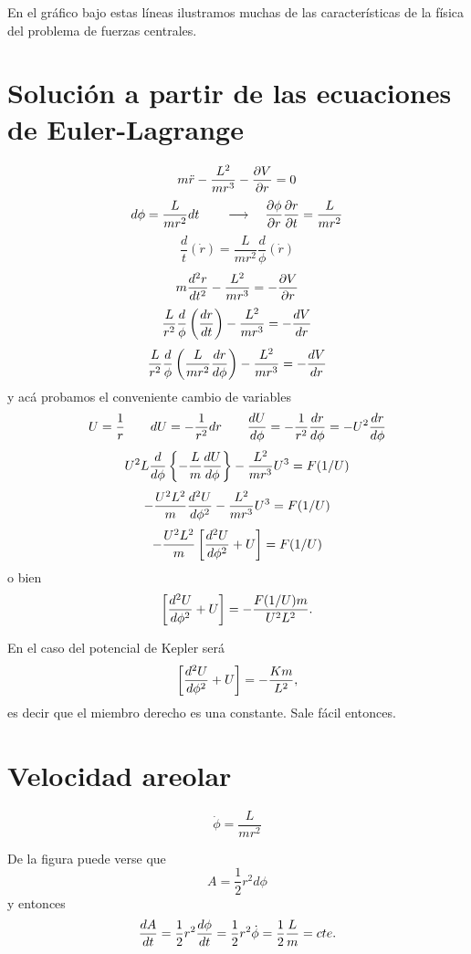 \documentclass[10pt,oneside]{CBFT_book}
\begin{document}
En el gráfico bajo estas líneas ilustramos muchas de las características de la física del problema
de fuerzas centrales.

\section{Solución a partir de las ecuaciones de Euler-Lagrange}

\[
	m \ddot{r} -\frac{L^2}{m r^3} -\dpar{V}{r}= 0 
\]
\[
	d \phi = \frac{L}{m r^2} dt \qquad \longrightarrow \quad  \dpar{\phi}{r}\dpar{r}{t}  = \frac{L}{m r^2}
\]
\[
	\frac{d}{t}(\dot{r}) = \frac{L}{m r^2} \frac{d}{\phi}(\dot{r})
\]
\[
	m \dtot[2]{r}{t} -\frac{L^2}{m r^3} = -\dpar{V}{r}
\]
\[
	\frac{L}{r^2} \frac{d}{\phi}\left( \dtot{r}{t} \right) -\frac{L^2}{m r^3} = -\dtot{V}{r}
\]
\[
	\frac{L}{r^2} \frac{d}{\phi}\left( \frac{L}{m r^2}\dtot{r}{\phi} \right) -\frac{L^2}{m r^3} = -\dtot{V}{r}
\]
y acá probamos el conveniente cambio de variables
\[
	U = \frac{1}{r} \qquad dU = -\frac{1}{r^2} dr 
	\qquad \dtot{U}{\phi} = -\frac{1}{r^2}\dtot{r}{\phi} = -U^2\dtot{r}{\phi}
\]
\[
	U^2 L \frac{d}{d\phi} \left\{ -\frac{L}{m}\dtot{U}{\phi} \right\} - \frac{L^2}{m r^3} U^3 = F(1/U)
\]
\[
	- \frac{U^2 L^2}{m} \dtot[2]{U}{\phi} - \frac{L^2}{m r^3} U^3 = F(1/U)
\]
\[
	- \frac{U^2 L^2}{m} \left[ \dtot[2]{U}{\phi} + U \right] = F(1/U)
\]
o bien 
\[
	\left[ \dtot[2]{U}{\phi} + U \right] = - \frac{F(1/U) m}{U^2 L^2}. 
\]

En el caso del potencial de Kepler será 
\[
	\left[ \dtot[2]{U}{\phi} + U \right] = - \frac{K m}{L^2},
\]
es decir que el miembro derecho es una constante. Sale fácil entonces.

\section{Velocidad areolar}

\[
	\dot{\phi} = \frac{L}{m r^2}
\]

De la figura puede verse que 
\[
	A = \frac{1}{2} r^2 d\phi 
\]
y  entonces
\[
	\dtot{A}{t} = \frac{1}{2} r^2 \dtot{\phi}{t} = \frac{1}{2} r^2 \dot{\phi} = \frac{1}{2}\frac{L}{m} = cte.
\]
\end{document}
